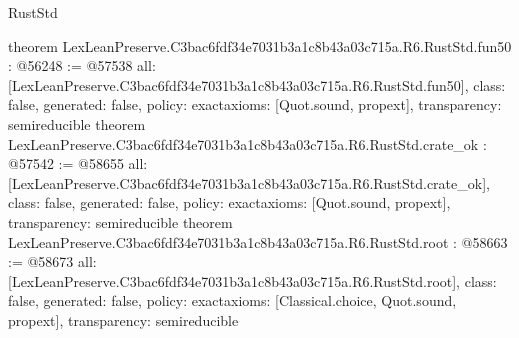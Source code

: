 \begin{lexlean}{RustStd}
\begin{coremodule}
{}
theorem LexLeanPreserve.C3bac6fdf34e7031b3a1c8b43a03c715a.R6.RustStd.fun50 : @56248 := @57538 {
  all: [LexLeanPreserve.C3bac6fdf34e7031b3a1c8b43a03c715a.R6.RustStd.fun50],
  class: false,
  generated: false,
  policy: exact{axioms: [Quot.sound, propext]},
  transparency: semireducible
}
theorem LexLeanPreserve.C3bac6fdf34e7031b3a1c8b43a03c715a.R6.RustStd.crate_ok : @57542 := @58655 {
  all: [LexLeanPreserve.C3bac6fdf34e7031b3a1c8b43a03c715a.R6.RustStd.crate_ok],
  class: false,
  generated: false,
  policy: exact{axioms: [Quot.sound, propext]},
  transparency: semireducible
}
theorem LexLeanPreserve.C3bac6fdf34e7031b3a1c8b43a03c715a.R6.RustStd.root : @58663 := @58673 {
  all: [LexLeanPreserve.C3bac6fdf34e7031b3a1c8b43a03c715a.R6.RustStd.root],
  class: false,
  generated: false,
  policy: exact{axioms: [Classical.choice, Quot.sound, propext]},
  transparency: semireducible
}


\end{coremodule}
\end{lexlean}

